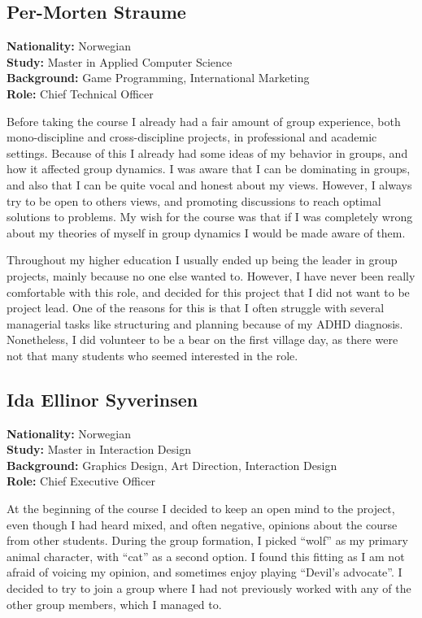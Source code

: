 \subsection{Per-Morten Straume}
\textbf{Nationality:} Norwegian \\
\textbf{Study:} Master in Applied Computer Science \\ 
\textbf{Background:} Game Programming, International Marketing \\
\textbf{Role:} Chief Technical Officer

Before taking the course I already had a fair amount of group experience, both mono-discipline and cross-discipline projects, in professional and academic settings. Because of this I already had some ideas of my behavior in groups, and how it affected group dynamics. I was aware that I can be dominating in groups, and also that I can be quite vocal and honest about my views. However, I always try to be open to others views, and promoting discussions to reach optimal solutions to problems. My wish for the course was that if I was completely wrong about my theories of myself in group dynamics I would be made aware of them.

Throughout my higher education I usually ended up being the leader in group projects, mainly because no one else wanted to. However, I have never been really comfortable with this role, and decided for this project that I did not want to be project lead. One of the reasons for this is that I often struggle with several managerial tasks like structuring and planning because of my ADHD diagnosis. Nonetheless, I did volunteer to be a bear on the first village day, as there were not that many students who seemed interested in the role.


\subsection{Ida Ellinor Syverinsen}
\textbf{Nationality:} Norwegian \\
\textbf{Study:} Master in Interaction Design \\
\textbf{Background:} Graphics Design, Art Direction, Interaction Design \\
\textbf{Role:} Chief Executive Officer

At the beginning of the course I decided to keep an open mind to the project, even though I had heard mixed, and often negative, opinions about the course from other students. During the group formation, I picked “wolf” as my primary animal character, with “cat” as a second option. I found this fitting as I am not afraid of voicing my opinion, and sometimes enjoy playing “Devil’s advocate”. I decided to try to join a group where I had not previously worked with any of the other group members, which I managed to. 

